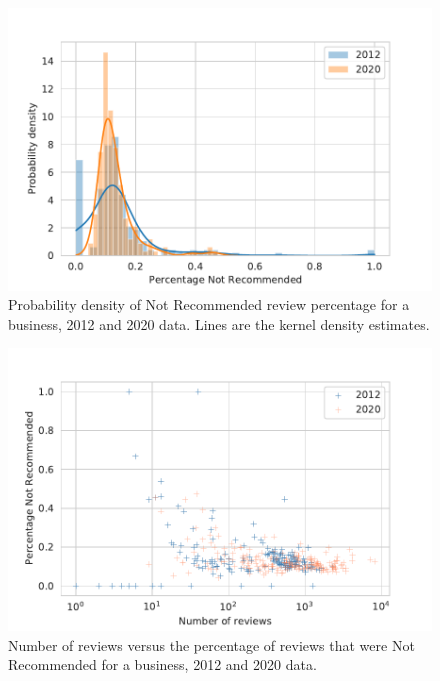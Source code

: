 \begin{figure}[t]
    \centering
    \includegraphics[width=0.9\columnwidth]{chapters/reviews/figures/filtered_proportion_density.pdf}
    \caption{Probability density of Not Recommended review percentage for a business, 2012 and 2020 data. Lines are the kernel density estimates.}
    \label{fig:filtered_density}
\end{figure}

\begin{figure}[t]
    \centering
    \includegraphics[width=0.9\columnwidth]{chapters/reviews/figures/filtered_vs_count.pdf}
    \caption{Number of reviews versus the percentage of reviews that were Not Recommended for a business, 2012 and 2020 data.}
    \label{fig:count_vs_perc}
\end{figure}

